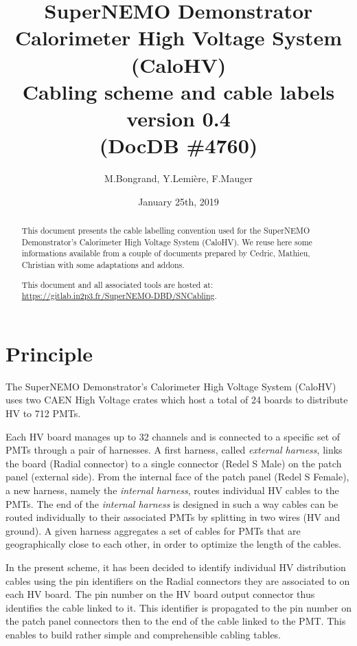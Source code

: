 \documentclass[12pt,a4paper]{article}
\title{SuperNEMO Demonstrator\\
  Calorimeter High Voltage System (CaloHV)\\
  Cabling scheme and cable labels\\
  version 0.4\\
(DocDB \#4760)}
\author{M.Bongrand, Y.Lemi\`ere, F.Mauger}
\date{January 25th, 2019}
\begin{document}
\maketitle

\begin{abstract}
  \noindent This document presents the cable labelling convention used
  for  the SuperNEMO  Demonstrator's Calorimeter  High Voltage  System
  (CaloHV).  We reuse  here some informations available  from a couple
  of documents prepared  by Cedric, Mathieu, Christian  with some adaptations
  and addons.

  \vskip 10pt
  \noindent This document and all associated tools
  are hosted at:
  \vskip 5pt
  \url{https://gitlab.in2p3.fr/SuperNEMO-DBD/SNCabling}.
  
\end{abstract}

\tableofcontents
\vfill

\clearpage
\section{Principle}

The SuperNEMO Demonstrator's Calorimeter  High Voltage System (CaloHV)
uses two CAEN High  Voltage crates which host a total  of 24 boards to
distribute HV to 712 PMTs.

Each HV board manages up to 32 channels and is connected to a specific
set of  PMTs through  a pair  of harnesses.   A first  harness, called
\emph{external  harness},  links the  board  (Radial  connector) to  a
single  connector  (Redel  S  Male)   on  the  patch  panel  (external
side). From the  internal face of the patch panel  (Redel S Female), a
new harness, namely the  \emph{internal harness}, routes individual HV
cables  to  the PMTs.   The  end  of  the \emph{internal  harness}  is
designed in  such a  way cables  can be  routed individually  to their
associated PMTs  by splitting in two  wires (HV and ground).   A given
harness aggregates  a set of  cables for PMTs that  are geographically
close to each other, in order to optimize the length of the cables.

In the present  scheme, it has been decided to  identify individual HV
distribution cables using the pin identifiers on the Radial connectors
they are  associated to on  each HV board.  The  pin number on  the HV
board output connector  thus identifies the cable linked  to it.  This
identifier  is  propagated  to  the  pin number  on  the  patch  panel
connectors  then to  the end  of the  cable linked  to the  PMT.  This
enables to build rather simple and comprehensible cabling tables.
\end{document}
